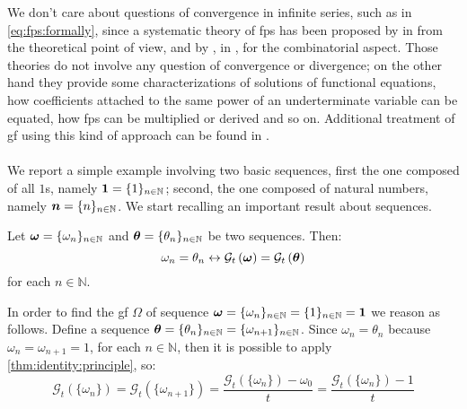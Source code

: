 We don't care about questions of convergence in infinite series, such as in
\autoref{eq:fps:formally}, since a systematic theory of \ac{fps} has been
proposed by \citeauthor{niven:1969} in \cite{niven:1969} from the theoretical
point of view, and by \citeauthor{riordan:1964}, in \cite{riordan:1964}, for
the combinatorial aspect.  Those theories do not involve any question of
convergence or divergence; on the other hand they provide some
characterizations of solutions of functional equations, how coefficients
attached to the same power of an underterminate variable can be equated, how
\ac{fps} can be multiplied or derived and so on. Additional treatment of \ac{gf}
using this kind of approach can be found in \cite{Wilf:2006:GEN:1204575}.
\\\\
We report a simple example involving two basic sequences, first the one
composed of all $1$s, namely $\boldsymbol{1}=\lbrace1\rbrace_{n\in\mathbb{N}}$; second, the
one composed of natural numbers, namely $\boldsymbol{n}=\lbrace n\rbrace_{n\in\mathbb{N}}$.
We start recalling an important result about sequences.
\begin{theorem}
    Let $\boldsymbol{\omega}=\lbrace\omega_{n}\rbrace_{n\in\mathbb{N}}$ and 
        $\boldsymbol{\theta}=\lbrace\theta_{n}\rbrace_{n\in\mathbb{N}}$ be two sequences.
        Then:
    \begin{displaymath}
        \omega_{n}=\theta_{n}\leftrightarrow\mathcal{G}_{t}\left(\boldsymbol{\omega}\right)
            =\mathcal{G}_{t}\left(\boldsymbol{\theta}\right)
    \end{displaymath}
    \label{thm:identity:principle}
    for each $n\in\mathbb{N}$.
\end{theorem}
In order to find the \ac{gf} $\Omega$ of sequence
$\boldsymbol{\omega}=\lbrace\omega_{n}\rbrace_{n\in\mathbb{N}}
=\lbrace1\rbrace_{n\in\mathbb{N}}=\boldsymbol{1}$ we reason as follows.  Define a sequence
$\boldsymbol{\theta}=\lbrace\theta_{n}\rbrace_{n\in\mathbb{N}}=\lbrace\omega_{n+1}\rbrace_{n\in\mathbb{N}}$.
Since $\omega_{n}=\theta_{n}$ because $\omega_{n}=\omega_{n+1}=1$, for each
$n\in\mathbb{N}$, then it is possible to apply
\autoref{thm:identity:principle}, so:
\begin{displaymath}
    \mathcal{G}_{t}\left(\lbrace\omega_{n}\rbrace\right) 
        =\mathcal{G}_{t}\left(\lbrace\omega_{n+1}\rbrace\right)
        =\frac{\mathcal{G}_{t}\left(\lbrace\omega_{n}\rbrace\right)-\omega_{0}}{t}
        =\frac{\mathcal{G}_{t}\left(\lbrace\omega_{n}\rbrace\right)-1}{t}
\end{displaymath}
